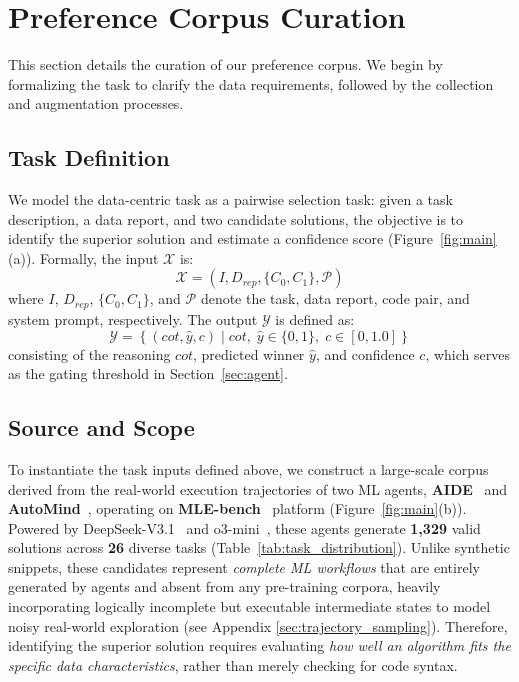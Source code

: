 \section{Preference Corpus Curation}
\label{sec:data-construction}

This section details the curation of our preference corpus. We begin by formalizing the task to clarify the data requirements, followed by the collection and augmentation processes.


\subsection{Task Definition}
\label{sec:task_definition}

We model the data-centric task as a pairwise selection task: given a task description, a data report, and two candidate solutions, the objective is to identify the superior solution and estimate a confidence score (Figure~\ref{fig:main}(a)).
Formally, the input $\mathcal{X}$ is:
\begin{equation}
    \mathcal{X} = \left( I, D_{rep}, \{C_0, C_1\}, \mathcal{P} \right)
\end{equation}
where $I$, $D_{rep}$, $\{C_0, C_1\}$, and $\mathcal{P}$ denote the task, data report, code pair, and system prompt, respectively. The output $\mathcal{Y}$ is defined as:
\begin{equation}
    \mathcal{Y} = \left\{ (cot, \hat{y}, c) \mid cot, \; \hat{y} \in \{0, 1\}, \; c \in [0, 1.0] \right\}
\end{equation}
consisting of the reasoning $cot$, predicted winner $\hat{y}$, and confidence $c$, which serves as the gating threshold in Section~\ref{sec:agent}.


\subsection{Source and Scope}
\label{sec:source_scope}

To instantiate the task inputs defined above, we construct a large-scale corpus derived from the real-world execution trajectories of two ML agents, \textbf{AIDE}~\cite{jiang2025aideaidrivenexplorationspace} and \textbf{AutoMind}~\cite{ou2025automindadaptiveknowledgeableagent}, operating on \textbf{MLE-bench}~\cite{chan2025mlebenchevaluatingmachinelearning} platform (Figure~\ref{fig:main}(b)).
Powered by DeepSeek-V3.1~\cite{deepseekai2025deepseekv3technicalreport} and o3-mini~\cite{openai2025o3card}, these agents generate \textbf{1,329} valid solutions across \textbf{26} diverse tasks (Table~\ref{tab:task_distribution}).
Unlike synthetic snippets, these candidates represent \textit{complete ML workflows} that are entirely generated by agents and absent from any pre-training corpora, heavily incorporating logically incomplete but executable intermediate states to model noisy real-world exploration (see Appendix \ref{sec:trajectory_sampling}).
Therefore, identifying the superior solution requires evaluating \textit{how well an algorithm fits the specific data characteristics}, rather than merely checking for code syntax.

